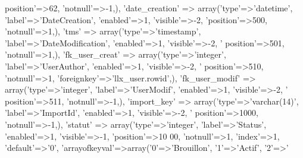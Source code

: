 \begin{DoxyCode}
{      position'}=>62, \textcolor{stringliteral}{'notnull'}=>-1,),
        \textcolor{stringliteral}{'date\_creation'} => array(\textcolor{stringliteral}{'type'}=>\textcolor{stringliteral}{'datetime'}, \textcolor{stringliteral}{'label'}=>\textcolor{stringliteral}{'DateCreation'}, \textcolor{stringliteral}{'enabled'}=>1, \textcolor{stringliteral}{'visible'}=>-2, \textcolor{stringliteral}{
      'position'}=>500, \textcolor{stringliteral}{'notnull'}=>1,),
        \textcolor{stringliteral}{'tms'} => array(\textcolor{stringliteral}{'type'}=>\textcolor{stringliteral}{'timestamp'}, \textcolor{stringliteral}{'label'}=>\textcolor{stringliteral}{'DateModification'}, \textcolor{stringliteral}{'enabled'}=>1, \textcolor{stringliteral}{'visible'}=>-2, \textcolor{stringliteral}{'
      position'}=>501, \textcolor{stringliteral}{'notnull'}=>1,),
        \textcolor{stringliteral}{'fk\_user\_creat'} => array(\textcolor{stringliteral}{'type'}=>\textcolor{stringliteral}{'integer'}, \textcolor{stringliteral}{'label'}=>\textcolor{stringliteral}{'UserAuthor'}, \textcolor{stringliteral}{'enabled'}=>1, \textcolor{stringliteral}{'visible'}=>-2, \textcolor{stringliteral}{'
      position'}=>510, \textcolor{stringliteral}{'notnull'}=>1, \textcolor{stringliteral}{'foreignkey'}=>\textcolor{stringliteral}{'llx\_user.rowid'},),
        \textcolor{stringliteral}{'fk\_user\_modif'} => array(\textcolor{stringliteral}{'type'}=>\textcolor{stringliteral}{'integer'}, \textcolor{stringliteral}{'label'}=>\textcolor{stringliteral}{'UserModif'}, \textcolor{stringliteral}{'enabled'}=>1, \textcolor{stringliteral}{'visible'}=>-2, \textcolor{stringliteral}{'
      position'}=>511, \textcolor{stringliteral}{'notnull'}=>-1,),
        \textcolor{stringliteral}{'import\_key'} => array(\textcolor{stringliteral}{'type'}=>\textcolor{stringliteral}{'varchar(14)'}, \textcolor{stringliteral}{'label'}=>\textcolor{stringliteral}{'ImportId'}, \textcolor{stringliteral}{'enabled'}=>1, \textcolor{stringliteral}{'visible'}=>-2, \textcolor{stringliteral}{'
      position'}=>1000, \textcolor{stringliteral}{'notnull'}=>-1,),
        \textcolor{stringliteral}{'statut'} => array(\textcolor{stringliteral}{'type'}=>\textcolor{stringliteral}{'integer'}, \textcolor{stringliteral}{'label'}=>\textcolor{stringliteral}{'Status'}, \textcolor{stringliteral}{'enabled'}=>1, \textcolor{stringliteral}{'visible'}=>-1, \textcolor{stringliteral}{'position'}=>10
      00, \textcolor{stringliteral}{'notnull'}=>1, \textcolor{stringliteral}{'index'}=>1, \textcolor{stringliteral}{'default'}=>\textcolor{charliteral}{'0'}, \textcolor{stringliteral}{'arrayofkeyval'}=>array(\textcolor{charliteral}{'0'}=>\textcolor{stringliteral}{'Brouillon'}, \textcolor{charliteral}{'1'}=>\textcolor{stringliteral}{'Actif'}, \textcolor{charliteral}{'2'}=>\textcolor{stringliteral}{'
}
\end{DoxyCode}

